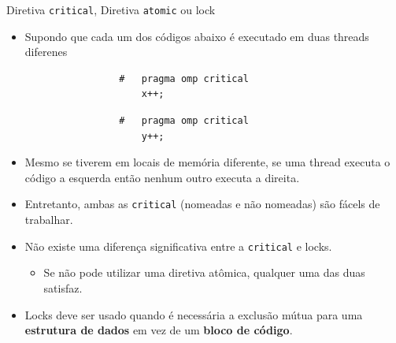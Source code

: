	\begin{frame}[fragile]{Diretiva {\tt critical}, Diretiva {\tt atomic} ou lock}
		\begin{itemize}
			\item Supondo que cada um dos códigos abaixo é executado em duas threads diferenes
		\end{itemize}

		\begin{multicols}{2}
				\begin{verbatim}
					#	pragma omp critical
						x++;
				\end{verbatim}
		\columnbreak
				\begin{verbatim}
					#	pragma omp critical
						y++;
				\end{verbatim}
		\end{multicols}
		\begin{itemize}
			\item Mesmo se tiverem em locais de memória diferente, se uma thread executa o código a esquerda então nenhum outro executa a direita.
			\item Entretanto, ambas as {\tt critical} (nomeadas e não nomeadas) são fácels de trabalhar.
			\item Não existe uma diferença significativa entre a {\tt critical} e locks.
			\begin{itemize}
				\item Se não pode utilizar uma diretiva atômica, qualquer uma das duas satisfaz.
			\end{itemize}
			\item Locks deve ser usado quando é necessária a exclusão mútua para uma \textbf{estrutura de dados} em vez de um \textbf{bloco de código}.
		\end{itemize}
\end{frame}

